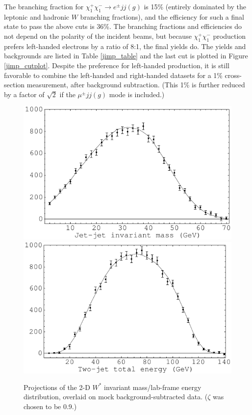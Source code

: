\documentclass[12pt]{article}
\begin{document}
The branching fraction for $\chi_1^+\chi_1^- \to e^\pm jj(g)$ is 15\%
(entirely dominated by the leptonic and hadronic $W$ branching
fractions), and the efficiency for such a final state to pass the
above cuts is 36\%.  The branching fractions and efficiencies do not
depend on the polarity of the incident beams, but because
$\chi_1^+\chi_1^-$ production prefers left-handed electrons by a ratio
of 8:1, the final yields do.  The yields and backgrounds are listed in
Table \ref{jimp_table} and the last cut is plotted in Figure
\ref{jimp_cutplot}.  Despite the preference for left-handed
production, it is still favorable to combine the left-handed and
right-handed datasets for a 1\% cross-section measurement, after
background subtraction.  (This 1\% is further reduced by a factor of
$\sqrt{2}$ if the $\mu^\pm jj(g)$ mode is included.)

\begin{figure}[t]
  \begin{center}
    \includegraphics[width=0.47\linewidth]{fake3_mass} \hfill
    \includegraphics[width=0.47\linewidth]{fake3_energy}
  \end{center}

  \caption{Projections of the 2-D $W^*$ invariant mass/lab-frame
    energy distribution, overlaid on mock background-subtracted
    data.  ($\zeta$ was chosen to be 0.9.) \label{jimp_wmassenergy}}
\end{figure}
\end{document}
